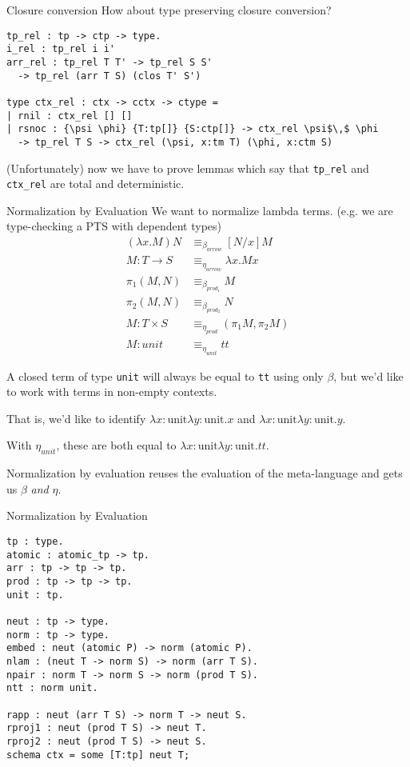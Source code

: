 \documentclass{beamer}
\begin{document}
\begin{frame}[fragile]{Closure conversion}
How about type preserving closure conversion?

\begin{lstlisting}
tp_rel : tp -> ctp -> type.
i_rel : tp_rel i i'
arr_rel : tp_rel T T' -> tp_rel S S'
  -> tp_rel (arr T S) (clos T' S')

type ctx_rel : ctx -> cctx -> ctype =
| rnil : ctx_rel [] []
| rsnoc : {\psi \phi} {T:tp[]} {S:ctp[]} -> ctx_rel \psi$\,$ \phi
  -> tp_rel T S -> ctx_rel (\psi, x:tm T) (\phi, x:ctm S)
\end{lstlisting}

(Unfortunately) now we have to prove lemmas which say that \lstinline!tp_rel! and \lstinline!ctx_rel! are total and deterministic.
\end{frame}

\begin{frame}[fragile]{Normalization by Evaluation}
We want to normalize lambda terms. (e.g. we are type-checking a PTS with dependent types) 
\begin{align*}
(\lambda x. M) N &\equiv_{\beta_{arrow}} [N/x]M\\
M : T \rightarrow S &\equiv_{\eta_{arrow}} \lambda x. M x\\
\pi_1 (M , N) &\equiv_{\beta_{prod_1}} M\\
\pi_2 (M , N) &\equiv_{\beta_{prod_2}} N\\
M : T \times S &\equiv_{\eta_{prod}} (\pi_1 M, \pi_2 M)\\
M : unit &\equiv_{\eta_{unit}} tt
\end{align*}

A closed term of type {\tt unit} will always be equal to {\tt tt} using only $\beta$, but we'd like to work with terms in non-empty contexts.

That is, we'd like to identify $\lambda x:\text{unit} \lambda y:\text{unit}. x$ and $\lambda x:\text{unit} \lambda y:\text{unit}. y$.

With $\eta_{unit}$, these are both equal to $\lambda x:\text{unit} \lambda y:\text{unit}. tt$.

Normalization by evaluation reuses the evaluation of the meta-language and gets us $\beta$ \emph{and} $\eta$.
\end{frame}

\begin{frame}[fragile]{Normalization by Evaluation}
\begin{lstlisting}
tp : type.
atomic : atomic_tp -> tp.
arr : tp -> tp -> tp.
prod : tp -> tp -> tp.
unit : tp.

neut : tp -> type.
norm : tp -> type.
embed : neut (atomic P) -> norm (atomic P).
nlam : (neut T -> norm S) -> norm (arr T S).
npair : norm T -> norm S -> norm (prod T S).
ntt : norm unit.

rapp : neut (arr T S) -> norm T -> neut S.
rproj1 : neut (prod T S) -> neut T.
rproj2 : neut (prod T S) -> neut S.
schema ctx = some [T:tp] neut T;
\end{lstlisting}
\end{frame}
\end{document}
